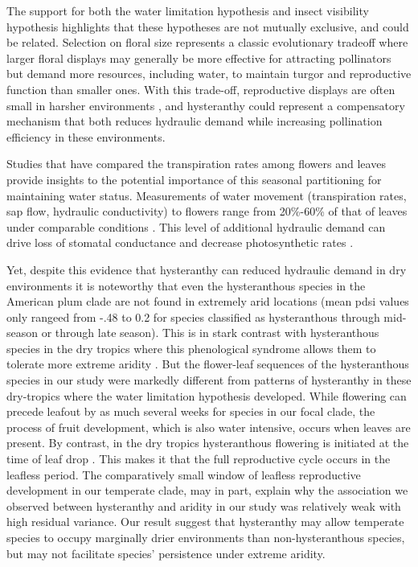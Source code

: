 \documentclass{article}[11pt]
\begin{document}
{The support for both the water limitation hypothesis and insect visibility hypothesis highlights that these hypotheses are not mutually exclusive, and could be related. Selection on floral size represents a classic evolutionary tradeoff where larger floral displays may generally be more effective for attracting pollinators but demand more resources, including water, to maintain turgor and reproductive function than smaller ones\citep{Galen:1999vr,Lambrecht:2007ur}. With this trade-off, reproductive displays are often small in harsher environments \citep{Teixido:2016aa,Lambrecht:2013aa}, and hysteranthy could represent a compensatory mechanism that both reduces hydraulic demand while increasing pollination efficiency in these environments.

Studies that have compared the transpiration rates among flowers and leaves provide insights to the potential importance of this seasonal partitioning for maintaining water status. Measurements of water movement (transpiration rates, sap flow, hydraulic conductivity) to flowers range from 20\%-60\% of that of leaves under comparable conditions \citep{Whiley:1988uf,Roddy:2012wn,Liu:2017wg,McMann:2022ww}. This level of additional hydraulic demand can drive loss of stomatal conductance and decrease photosynthetic rates \citep{Galen:1999vr}.
 
Yet, despite this evidence that hysteranthy can reduced hydraulic demand in dry environments it is noteworthy that even the hysteranthous species in the American plum clade are not found in extremely arid locations (mean pdsi values only rangeed from -.48 to 0.2 for species classified as hysteranthous through mid-season or through late season). This is in stark contrast with hysteranthous species in the dry tropics where this phenological syndrome allows  them to tolerate more extreme aridity \citep{Franklin2016}. But the flower-leaf sequences of the hysteranthous species in our study were markedly different from patterns of hysteranthy in these dry-tropics where the water limitation hypothesis developed. While flowering can precede leafout by as much several weeks for species in our focal clade, the process of fruit development, which is also water intensive, occurs when leaves are present. By contrast, in the dry tropics hysteranthous flowering is initiated at the time of leaf drop \citep{Borchert1983,Franklin2016}. This makes it that the full reproductive cycle occurs in the leafless period. The comparatively small window of leafless reproductive development in our temperate clade, may in part, explain why the association we observed between hysteranthy and aridity in our study was relatively weak with high residual variance. Our result suggest that hysteranthy may allow temperate species to occupy marginally drier environments than non-hysteranthous species, but may not facilitate species' persistence under extreme aridity. 

}
\end{document}
